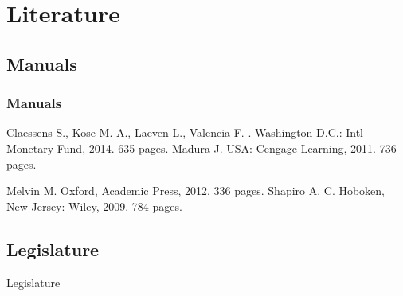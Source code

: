 \documentclass[international_finance_p1.tex]{subfiles}
\begin{document}
\section*{Literature}
\subsection*{Manuals}

\begin{frame}[shrink=15]
  \frametitle<presentation>{Manuals}
    
  \begin{thebibliography}{10}
    
  \beamertemplatebookbibitems

	Claessens S., Kose M. A., Laeven L., Valencia F.
    .
    \newblock Washington D.C.: Intl Monetary Fund, 2014. 635 pages.
	Madura J.
	\newblock USA: Cengage Learning, 2011. 736 pages. 
	
	Melvin M.
	\newblock Oxford, Academic Press, 2012. 336 pages.
	Shapiro A. C.
	\newblock Hoboken, New Jersey: Wiley, 2009. 784 pages.
	\end{thebibliography}
\end{frame}
\subsection*{Legislature}
\begin{frame}{Legislature}
  \begin{thebibliography}{10}
    
  \beamertemplatearticlebibitems
	\end{thebibliography}
\end{frame}
\end{document}
